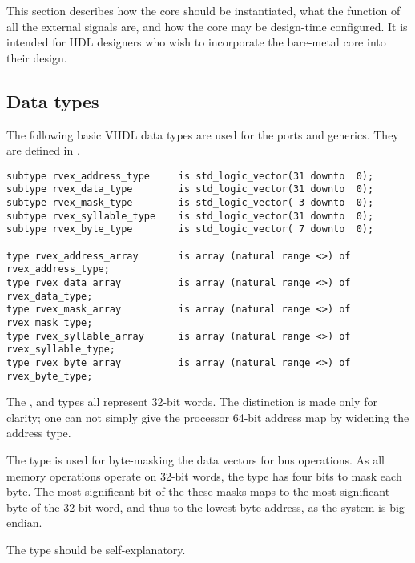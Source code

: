 
\label{sec:core-ug-inst}

This section describes how the core should be instantiated, what the function of
all the external signals are, and how the core may be design-time configured. It
is intended for HDL designers who wish to incorporate the bare-metal core into
their design. 

\subsection{Data types}
\label{sec:core-ug-inst-types}

The following basic VHDL data types are used for the ports and generics. They
are defined in .

\begin{lstlisting}[numbers=none]
subtype rvex_address_type     is std_logic_vector(31 downto  0);
subtype rvex_data_type        is std_logic_vector(31 downto  0);
subtype rvex_mask_type        is std_logic_vector( 3 downto  0);
subtype rvex_syllable_type    is std_logic_vector(31 downto  0);
subtype rvex_byte_type        is std_logic_vector( 7 downto  0);

type rvex_address_array       is array (natural range <>) of rvex_address_type;
type rvex_data_array          is array (natural range <>) of rvex_data_type;
type rvex_mask_array          is array (natural range <>) of rvex_mask_type;
type rvex_syllable_array      is array (natural range <>) of rvex_syllable_type;
type rvex_byte_array          is array (natural range <>) of rvex_byte_type;
\end{lstlisting}

\noindent The ,  and  types all 
represent 32-bit words. The distinction is made only for clarity; one can not 
simply give the \rvex{} processor 64-bit address map by widening the address 
type.

The  type is used for byte-masking the data vectors for bus
operations. As all memory operations operate on 32-bit words, the 
type has four bits to mask each byte. The most significant bit of the these
masks maps to the most significant byte of the 32-bit word, and thus to the
lowest byte address, as the \rvex{} system is big endian.

The  type should be self-explanatory.

